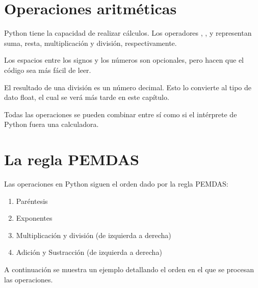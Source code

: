 
\section{Operaciones aritméticas}

Python tiene la capacidad de realizar cálculos. Los operadores \ttt{+}, \ttt{-}, \ttt{*} y \ttt{/} representan suma, resta, multiplicación y división, respectivamente.


Los espacios entre los signos y los números son opcionales, pero hacen que el código sea más fácil de leer.\smallskip

El resultado de una división es un número decimal. Esto lo convierte al tipo de dato float, el cual se verá más tarde en este capítulo.


Todas las operaciones se pueden combinar entre sí como si el intérprete de Python fuera una calculadora.


\section{La regla PEMDAS}

Las operaciones en Python siguen el orden dado por la regla PEMDAS:

\begin{enumerate}
  \item Paréntesis \ttt{()}
  
  \item Exponentes \ttt{**}
  
  \item Multiplicación \ttt{*} y división \ttt{/} (de izquierda a derecha)
  
  \item Adición \ttt{+} y Sustracción \ttt{-} (de izquierda a derecha)
  
\end{enumerate}

A continuación se muestra un ejemplo detallando el orden en el que se procesan las operaciones.


